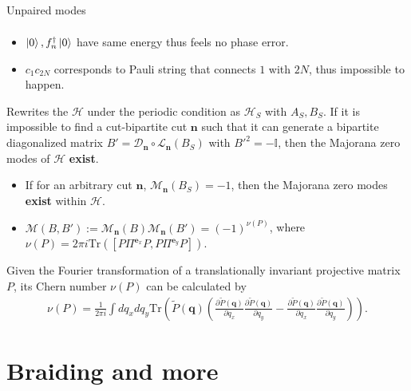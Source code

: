 \documentclass{beamer}
\begin{document}
\begin{frame}[allowframebreaks]{Unpaired modes}
\begin{align}
\end{align}
\begin{itemize}
    \item $\ket{0}, f_n^\dagger\ket{0}$ have same energy thus feels no phase error.
    \item $c_1c_{2N}$ corresponds to Pauli string that connects $1$ with $2N$, thus impossible to happen.
\end{itemize}
\begin{theorem}\label{theo: topo_ob}
   Rewrites the $\mathcal{H}$ under the periodic condition as $\mathcal{H}_S$ with $A_{S},B_S$.   If it is impossible to find a cut-bipartite cut $\mathbf{n}$ such that it can generate a bipartite diagonalized matrix $B'=\mathcal{D}_{\mathbf{n}}\circ \mathcal{L}_{\mathbf n}(B_S)$ with $B'^2 = -\mathbb{I}$,  then the Majorana zero modes of $\mathcal{H}$ \textbf{exist}.
\end{theorem}
\newpage
\begin{theorem}\label{theo:suff_cond_zeromode}
\begin{itemize}
    \item  If for an arbitrary cut $\mathbf{n}$, $\mathcal{M}_{\mathbf{n}}(B_S) = -1$, then the Majorana zero modes\textbf{ exist} within $\mathcal{H}$.
    \item  $ \mathcal{M}(B,B') :=\mathcal{M}_{\mathbf{n}}(B) \mathcal{M}_{\mathbf{n}}(B')= (-1)^{\nu(P)}$, where $\nu(P) = 2\pi i \text{Tr}\left([P \Pi^{\mathbf e_x} P,P \Pi^{\mathbf e_y} P]\right)$.
\end{itemize}
\end{theorem}
\begin{lemma}\label{lemma:Chern_numb_cal}
    Given the Fourier transformation of a translationally invariant projective matrix $P$, its Chern number $\nu(P)$ can be calculated by
    \begin{align}
        \nu(P) = \frac{1}{2\pi i} \int dq_xdq_y \text{Tr}\left(\tilde P(\mathbf{q})\left(\frac{\partial\tilde P(\mathbf{q})}{\partial q_x}\frac{\partial\tilde P(\mathbf{q})}{\partial q_y}-\frac{\partial\tilde P(\mathbf{q})}{\partial q_x}\frac{\partial\tilde P(\mathbf{q})}{\partial q_y}\right)\right).
    \end{align}
\end{lemma}
\end{frame}
\section{Braiding and more}
\end{document}
